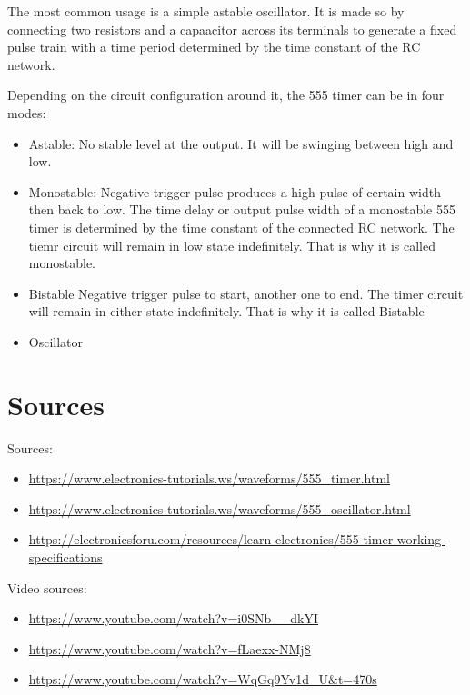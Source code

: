 \documentclass[12pt]{extarticle}
\begin{document}
The most common usage is a simple astable oscillator. It is made so by connecting two resistors and a capaacitor across its terminals to generate a fixed pulse train with a time period determined by the time constant of the RC network.

Depending on the circuit configuration around it, the 555 timer can be in four modes:
\begin{itemize}
  \item Astable: No stable level at the output. It will be swinging between high and low.
  \item Monostable: Negative trigger pulse produces a high pulse of certain width then back to low.
  The time delay or output pulse width of a monostable 555 timer is determined by the time constant of the connected RC network. The tiemr circuit will remain in low state indefinitely. That is why it is called monostable.
  \item Bistable Negative trigger pulse to start, another one to end. The timer circuit will remain in either state indefinitely. That is why it is called Bistable
  \item Oscillator
\end{itemize}






\section{Sources}
Sources:
\begin{itemize}
  \item \url{https://www.electronics-tutorials.ws/waveforms/555_timer.html}
  \item \url{https://www.electronics-tutorials.ws/waveforms/555_oscillator.html}
  \item \url{https://electronicsforu.com/resources/learn-electronics/555-timer-working-specifications}
\end{itemize}
Video sources:
\begin{itemize}
  \item \url{https://www.youtube.com/watch?v=i0SNb__dkYI}
  \item \url{https://www.youtube.com/watch?v=fLaexx-NMj8}
  \item \url{https://www.youtube.com/watch?v=WqGq9Yv1d_U&t=470s}
\end{itemize}
\end{document}
